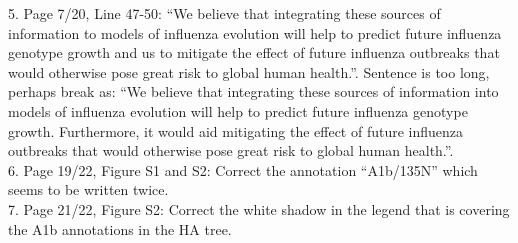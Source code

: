 \documentclass[11pt,oneside,letterpaper]{article}
\begin{document}
5. Page 7/20, Line 47-50: “We believe that integrating these sources of information to models of influenza evolution will help to predict future influenza genotype growth and us to mitigate the effect of future influenza outbreaks that would otherwise pose great risk to global human health.”. Sentence is too long, perhaps break as: “We believe that integrating these sources of information into models of influenza evolution will help to predict future influenza genotype growth. Furthermore, it would aid mitigating the effect of future influenza outbreaks that would otherwise pose great risk to global human health.”.\\

6. Page 19/22, Figure S1 and S2: Correct the annotation “A1b/135N” which seems to be written twice.\\

7. Page 21/22, Figure S2: Correct the white shadow in the legend that is covering the A1b annotations in the HA tree.\\


% 
\end{document}
